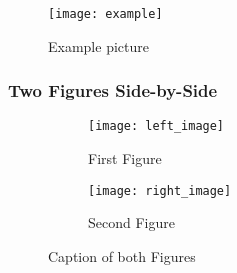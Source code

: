 \begin{figure}[H]
  \caption{Example picture}
  \centering
    \texttt{[image: example]}
\end{figure}

\subsubsection{Two Figures Side-by-Side}
\label{subsubsec:two_Figures}

\begin{figure}[h]
\begin{subfigure}{0.48\textwidth}
\texttt{[image: left\_image]}
\caption{First Figure}
\end{subfigure} \hspace{0.04\textwidth}
\begin{subfigure}{0.48\textwidth}
\texttt{[image: right\_image]}
\caption{Second Figure}
\end{subfigure}
\caption{Caption of both Figures}
\end{figure}

